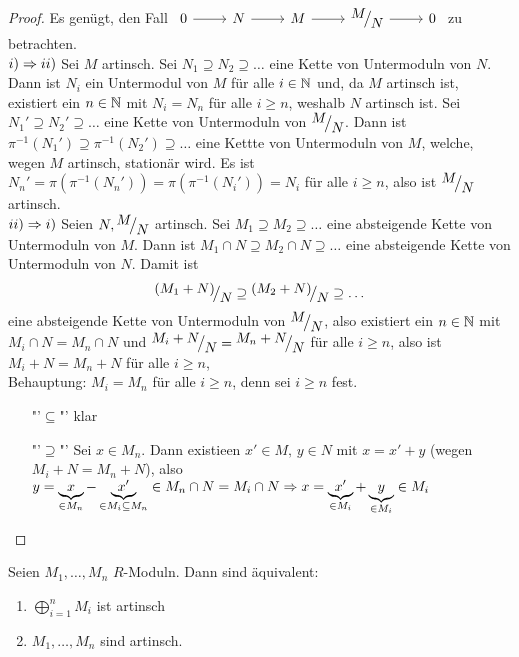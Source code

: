 \begin{proof}
	Es genügt, den Fall $\begin{tikzcd}
	0 \arrow{r} & N \arrow{r} & M\arrow{r} & \QR{M}{N} \arrow{r} & 0
	\end{tikzcd}$ zu betrachten.\\
	$i) \Rightarrow ii)$ Sei $M$ artinsch. Sei $N_1 \supseteq N_2 \supseteq \ldots$ eine Kette von Untermoduln von $N$. Dann ist $N_i$ ein Untermodul von $M$ für alle $i\in \mathbb{N}$ und, da $M$ artinsch ist, existiert ein $n\in \mathbb{N}$ mit $N_i = N_n$ für alle $i\geq n$, weshalb $N$ artinsch ist. Sei $N_1' \supseteq N_2'\supseteq \ldots$ eine Kette von Untermoduln von $\QR{M}{N}$. Dann ist $\pi^{-1}(N_1') \supseteq \pi^{-1}(N_2') \supseteq \ldots$ eine Kettte von Untermoduln von $M$, welche, wegen $M$ artinsch, stationär wird. Es ist $N_n' = \pi (\pi^{-1}(N_n')) = \pi(\pi^{-1}(N_i')) = N_i$ für alle $i\geq n$, also ist $\QR{M}{N}$ artinsch.\\
	$ii) \Rightarrow i)$ Seien $N, \QR{M}{N}$ artinsch. Sei $M_1 \supseteq M_2 \supseteq \ldots$ eine absteigende Kette von Untermoduln von $M$. Dann ist $M_1 \cap N \supseteq M_2 \cap N \supseteq \ldots$ eine absteigende Kette von Untermoduln von $N$. Damit ist 
	$$\QR{(M_1+N)}{N} \supseteq \QR{(M_2+N)}{N} \supseteq \ldots$$
	eine absteigende Kette von Untermoduln von $\QR{M}{N}$, also existiert ein $n\in \mathbb{N}$ mit $M_i \cap N = M_n \cap N$ und $\QR{M_i + N}{N} = \QR{M_n+N}{N} $ für alle $i\geq n$, also ist $M_i + N = M_n + N$ für alle $i\geq n$, \\
	Behauptung: $M_i = M_n$ für alle $i\geq n$, denn sei $i\geq n$ fest. 
	\begin{enumerate}
		\item["'$\subseteq$"'] klar
		\item["'$\supseteq$"'] Sei $x\in M_n$. Dann existieen $x' \in M, \, y\in N$ mit $x = x' + y$ (wegen $M_i + N = M_n + N$), also $y= \underbrace{x}_{\in M_n} - \underbrace{x'}_{\in M_i \subseteq M_n} \in M_n \cap N = M_i \cap N \Rightarrow  x= \underbrace{x'}_{\in M_i} + \underbrace{y}_{\in M_i} \in M_i$ 
	\end{enumerate}
\end{proof}
\begin{fo}\label{fo3.18}
	Seien $M_1, \ldots, M_n$ $R$-Moduln. Dann sind äquivalent:
	\begin{enumerate}[label= \roman*)]
		\item $\bigoplus_{i=1}^n M_i$ ist artinsch
		\item $M_1, \ldots, M_n$ sind artinsch.
	\end{enumerate}
\end{fo}
